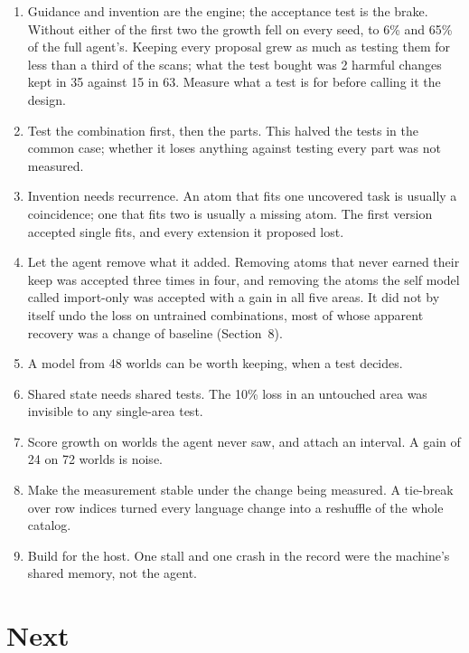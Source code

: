 \documentclass[11pt]{article}
\begin{document}
\begin{enumerate}[leftmargin=*]
\item Guidance and invention are the engine; the acceptance test is the brake. Without either of the first two the growth fell on every seed, to 6\% and 65\% of the full agent's. Keeping every proposal grew as much as testing them for less than a third of the scans; what the test bought was 2 harmful changes kept in 35 against 15 in 63. Measure what a test is for before calling it the design.
\item Test the combination first, then the parts. This halved the tests in the common case; whether it loses anything against testing every part was not measured.
\item Invention needs recurrence. An atom that fits one uncovered task is usually a coincidence; one that fits two is usually a missing atom. The first version accepted single fits, and every extension it proposed lost.
\item Let the agent remove what it added. Removing atoms that never earned their keep was accepted three times in four, and removing the atoms the self model called import-only was accepted with a gain in all five areas. It did not by itself undo the loss on untrained combinations, most of whose apparent recovery was a change of baseline (Section~8).
\item A model from 48 worlds can be worth keeping, when a test decides.
\item Shared state needs shared tests. The 10\% loss in an untouched area was invisible to any single-area test.
\item Score growth on worlds the agent never saw, and attach an interval. A gain of 24 on 72 worlds is noise.
\item Make the measurement stable under the change being measured. A tie-break over row indices turned every language change into a reshuffle of the whole catalog.
\item Build for the host. One stall and one crash in the record were the machine's shared memory, not the agent.
\end{enumerate}

\section{Next}
\end{document}
